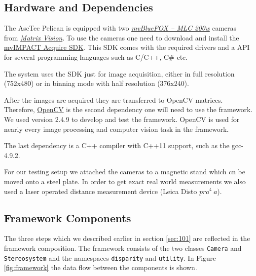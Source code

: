 \documentclass[11pt]{article}
\begin{document}
\subsection{Hardware and Dependencies}\label{sec:hardware}
The AscTec Pelican is equipped with two  \emph{\href{http://www.matrix-vision.com/USB2.0-single-board-camera-mvbluefox-mlc.html?camera=mvBlueFOX-MLC200wC&selectInterface=Alle&selectMpixels=Alle&selectFps=Alle&selectSensor=Alle&selectColor=Alle&selectSize=Alle&selectShutter=Alle&selectModel=Alle&col=1&row=0}{mvBlueFOX -- MLC 200w}} cameras from \emph{\href{http://www.matrix-vision.com/home-en.html}{Matrix Vision}}. To use the cameras one need to download and install the \href{http://www.matrix-vision.com/programming-interface-mvimpact-acquire.html}{mvIMPACT Acquire SDK}. This SDK comes with the required drivers and a API for several programming languages such as C/C++, C\# etc. 

The system uses the SDK just for image acquisition, either in full resolution (752x480) or in binning mode with half resolution (376x240).

After the images are acquired they are transferred to OpenCV matrices. Therefore, \href{http://opencv.org/}{OpenCV} is the second dependency one will need to use the framework. We used version 2.4.9 to develop and test the framework. OpenCV is used for nearly every image processing and computer vision task in the framework.

The last dependency is a C++ compiler with C++11 support, such as the gcc-4.9.2.

For our testing setup we attached the cameras to a magnetic stand which cn be moved onto a steel plate. In order to get exact real world measurements we also used a laser operated distance measurement device (Leica Disto $pro^4\ a$).

\subsection{Framework Components}
The three steps which we described earlier in section \ref{sec:101} are reflected in the framework composition. The framework consists of the two classes \texttt{Camera} and \texttt{Stereosystem} and the namespaces \texttt{disparity} and \texttt{utility}. In Figure \ref{fig:framework} the data flow between the components is shown.
\end{document}
